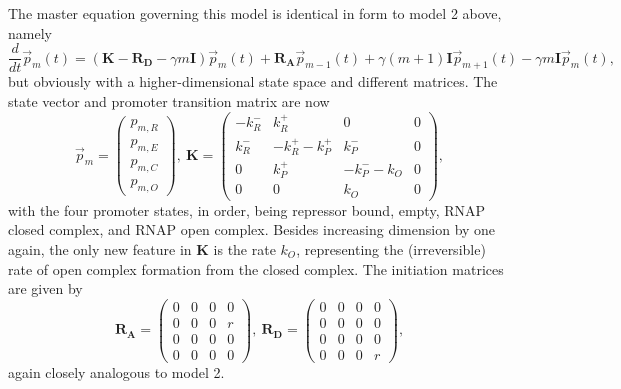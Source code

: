 \documentclass[12pt]{article}%
\newcommand{\vect}[1]{\vec{#1}}
\newcommand{\matr}[1]{\mathbf{#1}}
\newcommand{\deriv}[2][{}]{\frac{d #1}{d #2}}
\begin{document}
The master equation governing this model is
identical in form to model 2 above, namely
\begin{equation}
\deriv{t}\vect{p}_m(t) =
\left( \matr{K} - \matr{R_D} - \gamma m \matr{I} \right) \vect{p}_m(t)
                + \matr{R_A} \vect{p}_{m-1}(t) +
                \gamma (m+1) \matr{I} \vect{p}_{m+1}(t)
                - \gamma m \matr{I} \vect{p}_m(t),
\end{equation}
but obviously with a higher-dimensional state space and different matrices.
The state vector and promoter transition matrix are now
\begin{equation}
\vect{p}_m = \begin{pmatrix} p_{m,R} \\ p_{m,E} \\
                             p_{m,C} \\ p_{m,O}\end{pmatrix},\
\matr{K} = \begin{pmatrix} -k_R^- & k_R^+ & 0 & 0\\
                        k_R^- & -k_R^+ -k_P^+ & k_P^- & 0 \\
                        0 & k_P^+ & -k_P^- - k_O & 0 \\
                        0 & 0 & k_O & 0
                \end{pmatrix},
\end{equation}
with the four promoter states, in order, being repressor bound,
empty, RNAP closed complex, and RNAP open complex.
Besides increasing dimension by one again, the only new feature in
$\matr{K}$ is the rate $k_O$, representing the (irreversible)
rate of open complex formation from the closed complex.
The initiation matrices are given by
\begin{equation}
\matr{R_A} = \begin{pmatrix}
        0 & 0 & 0 & 0 \\ 0 & 0 & 0 & r \\ 0 & 0 & 0 & 0\\ 0 & 0 & 0 & 0
                \end{pmatrix},\
\matr{R_D} = \begin{pmatrix}
        0 & 0 & 0 & 0 \\ 0 & 0 & 0 & 0 \\ 0 & 0 & 0 & 0\\ 0 & 0 & 0 & r
                \end{pmatrix},
\end{equation}
again closely analogous to model 2.
\end{document}
